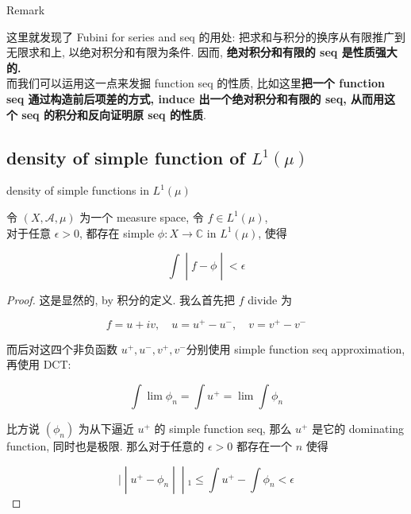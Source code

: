 \documentclass{qlnotes-export}
\begin{document}
\begin{qlremark}{Remark}

这里就发现了 Fubini for series and seq 的用处: 把求和与积分的换序从有限推广到无限求和上, 以绝对积分和有限为条件. 因而, \textbf{绝对积分和有限的 seq 是性质强大的.}\\
而我们可以运用这一点来发掘 function seq 的性质, 比如这里\textbf{把一个 function seq 通过构造前后项差的方式, induce 出一个绝对积分和有限的 seq, 从而用这个 seq 的积分和反向证明原 seq 的性质}.

\end{qlremark}

\subsection{\texorpdfstring{density of simple function of \(L^{1}(\mu)\)}{density of simple function of L\^{}\{1\}(\textbackslash mu)}}\label{density-of-simple-function-of-l1mu}

\begin{theorem}{density of simple functions in \(L^{1}(\mu)\)}\label{thm-05-integration-of-real-and-complex-functions-density-of-simple-functions-in-l-1-mu}

令 \((X,\mathcal{A},\mu)\) 为一个 measure space, 令 \(f \in L^{1}(\mu)\),\\
对于任意 \(\epsilon > 0\), 都存在 simple \(\phi:X\rightarrow{\mathbb{C}}\) in \(L^{1}(\mu)\), 使得

\[\left. \int \middle| f - \phi \middle| < \epsilon \right.\]

\end{theorem}

\begin{proof}

这是显然的, by 积分的定义. 我么首先把 \(f\) divide 为

\[f = u + iv,\quad u = u^{+} - u^{-},\quad v = v^{+} - v^{-}\]

而后对这四个非负函数 \(u^{+},u^{-},v^{+},v^{-}\)分别使用 simple function seq approximation, 再使用 DCT:

\[\int\lim\phi_{n} = \int u^{+} = \lim\int\phi_{n}\]

比方说 \((\phi_{n})\) 为从下逼近 \(u^{+}\) 的 simple function seq, 那么 \(u^{+}\) 是它的 dominating function, 同时也是极限. 那么对于任意的 \(\epsilon > 0\) 都存在一个 \(n\) 使得

\[\left. | \middle| u^{+} - \phi_{n} \middle| \middle| {}_{1} \leq \int u^{+} - \int\phi_{n} < \epsilon \right.\]

\end{proof}
\end{document}
